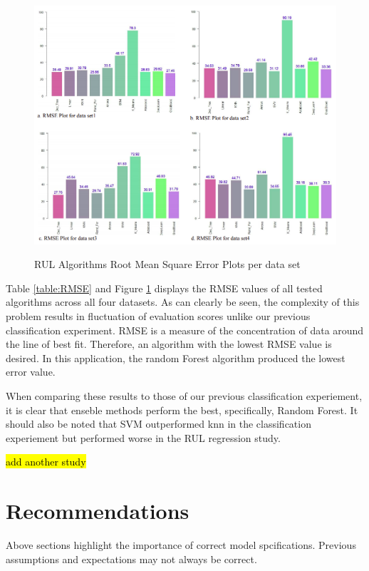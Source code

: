 \documentclass[a4paper,12pt]{report}
\begin{document}
\begin{figure}[H]
    \caption{RUL Algorithms Root Mean Square Error Plots per data set\cite{RUL}}
    \includegraphics[scale=0.4]{RUL_RMSE.png}
    \label{fig:RMSE Plots}
\end{figure}

Table \ref{table:RMSE} and Figure \ref{fig:RMSE Plots} displays the RMSE values of all tested algorithms across all four datasets.
As can clearly be seen, the complexity of this problem results in fluctuation of evaluation scores unlike our previous classification experiment.
RMSE is a measure of the concentration of data around the line of best fit. Therefore, an algorithm with the lowest RMSE value is desired.
In this application, the random Forest algorithm produced the lowest error value.

When comparing these results to those of our previous classification experiement, it is clear that enseble methods perform the best, specifically, Random Forest. 
It should also be noted that SVM outperformed knn in the classification experiement but performed worse in the RUL regression study.


\bigskip
\hl{add another study}

\section{Recommendations}
Above sections highlight the importance of correct model spcifications. Previous assumptions and expectations may not always be correct.
\end{document}
